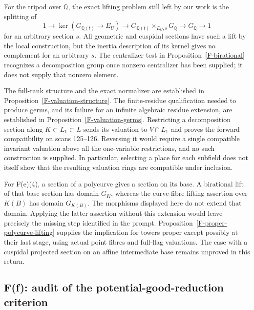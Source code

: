 \begin{remark}
\label{F-open-valuations}
For the tripod over $\mathbb Q$, the exact lifting problem still
left by our work is the splitting of
\[
 1\longrightarrow\ker(G_{\mathbb Q(t)}\to E_U)
 \longrightarrow G_{\mathbb Q(t)}\times_{E_U,s}G_{\mathbb Q}
 \longrightarrow G_{\mathbb Q}\longrightarrow1
\]
for an arbitrary section $s$. All geometric and cuspidal sections
have such a lift by the local construction, but the inertia
description of its kernel gives no complement for an arbitrary
$s$. The centralizer test in Proposition~\ref{F-birational}
recognizes a decomposition group once nonzero centralizer has
been supplied; it does not supply that nonzero element.

The full-rank structure and the exact normalizer are established
in Proposition~\ref{F-valuation-structure}. The finite-residue
qualification needed to produce germs, and its failure for an
infinite algebraic residue extension, are established in
Proposition~\ref{F-valuation-germs}. Restricting a decomposition
section along $K\subset L_1\subset L$ sends its valuation to
$V\cap L_1$ and proves the forward compatibility on scans
125--126. Reversing it would require a single compatible invariant
valuation above all the one-variable restrictions, and no such
construction is supplied. In particular, selecting a place for
each subfield does not itself show that the resulting valuation
rings are compatible under inclusion.

For F(e)(4), a section of a polycurve gives a section on its base.
A birational lift of that base section has domain $G_K$, whereas
the curve-fibre lifting assertion over $K(B)$ has domain
$G_{K(B)}$. The morphisms displayed here do not extend that
domain. Applying the latter assertion without this extension
would leave precisely the missing step identified in the prompt.
Proposition~\ref{F-proper-polycurve-lifting} supplies the
implication for towers proper except possibly at their last stage,
using actual point fibres and full-flag valuations. The case with
a cuspidal projected section on an affine intermediate base remains
unproved in this return.
\end{remark}

\subsection{F(f): audit of the potential-good-reduction criterion}

